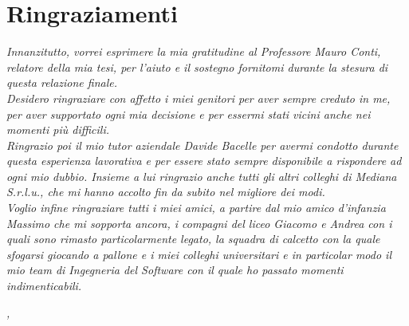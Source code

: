 
\cleardoublepage
{}
{}



\bigskip

\begingroup
\let\clearpage\relax
\let\cleardoublepage\relax
\let\cleardoublepage\relax

\chapter*{Ringraziamenti}

\textit{Innanzitutto, vorrei esprimere la mia gratitudine al Professore Mauro Conti, relatore della mia tesi, per l'aiuto e il sostegno fornitomi durante la stesura di questa relazione finale.}\\

\textit{Desidero ringraziare con affetto i miei genitori per aver sempre creduto in me, per aver supportato ogni mia decisione e per essermi stati vicini anche nei momenti più difficili.}\\

\textit{Ringrazio poi il mio tutor aziendale Davide Bacelle per avermi condotto durante questa esperienza lavorativa e per essere stato sempre disponibile a rispondere ad ogni mio dubbio. Insieme a lui ringrazio anche tutti gli altri colleghi di Mediana S.r.l.u., che mi hanno accolto fin da subito nel migliore dei modi.}\\

\textit{Voglio infine ringraziare tutti i miei amici, a partire dal mio amico d'infanzia Massimo che mi sopporta ancora, i compagni del liceo Giacomo e Andrea con i quali sono rimasto particolarmente legato, la squadra di calcetto con la quale sfogarsi giocando a pallone e i miei colleghi universitari e in particolar modo il mio team di Ingegneria del Software con il quale ho passato momenti indimenticabili.}\\
\bigskip

\textit{\myLocation, \myTime}
\hfill \myName

\endgroup

